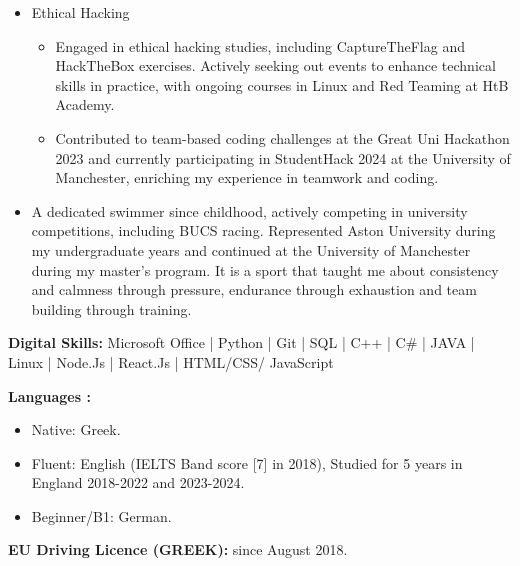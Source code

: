 \begin{itemize}
      \item Ethical Hacking
            \begin{itemize}
                  \item Engaged in ethical hacking studies, including CaptureTheFlag and HackTheBox exercises. Actively
                        seeking out events to enhance technical skills in practice, with ongoing courses in Linux and Red
                        Teaming at HtB Academy.
                  \item Contributed to team-based coding challenges at the Great Uni Hackathon 2023 and currently
                        participating in StudentHack 2024 at the University of Manchester, enriching my experience in
                        teamwork and coding.
            \end{itemize}
      \item A dedicated swimmer since childhood, actively competing in university competitions, including
            BUCS racing. Represented Aston University during my undergraduate years and continued at the University
            of Manchester during my master's program. It is a sport that taught me about consistency and calmness
            through pressure, endurance through exhaustion and team building through training.

\end{itemize}

\vspace{10pt}

\textbf{Digital Skills:}
Microsoft Office | Python | Git | SQL | C++ | C\# | JAVA | Linux | Node.Js | React.Js | HTML/CSS/
JavaScript

\vspace{10pt}

\textbf{Languages :}
\begin{itemize}
      \item Native: Greek.
      \item Fluent: English (IELTS Band score [7] in 2018), Studied for 5 years in England 2018-2022 and 2023-2024.
      \item Beginner/B1: German.
\end{itemize}

\textbf{EU Driving Licence (GREEK):} since August 2018.